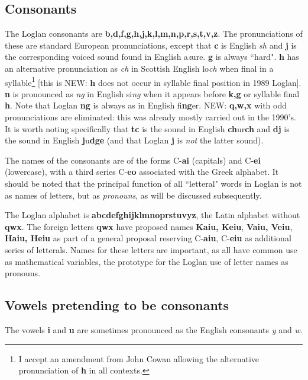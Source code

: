 \documentclass[12pt]{book}
\begin{document}
\subsection{Consonants}

The Loglan consonants are {\bf b,d,f,g,h,j,k,l,m,n,p,r,s,t,v,z}.  The pronunciations of these are standard European pronunciations, except that {\bf c} is English {\em sh} and {\bf j} is the corresponding voiced sound found in English a{\em z}ure.  {\bf g} is always ``hard".  {\bf h} has an alternative pronunciation as {\em ch} in Scottish English lo{\em ch} when final in a syllable\footnote{I accept an amendment from John Cowan allowing the alternative pronunciation of {\bf h} in all contexts.} [this is NEW:  {\bf h} does not occur in syllable final position in 1989 Loglan].  {\bf n} is pronounced as {\em ng} in English si{\em ng} when it appears before {\bf k,g} or syllable final {\bf h}.  Note that Loglan {\bf ng} is always as in English fi{\bf ng}er.  NEW:  {\bf q,w,x} with odd pronunciations are eliminated:  this was already mostly carried out in the 1990's.  It is worth noting specifically that {\bf tc} is the sound in English {\bf ch}ur{\bf ch} and {\bf dj} is the sound in English {\bf j}u{\bf dge} (and that Loglan {\bf j} is {\em not\/} the latter sound).

The names of the consonants are of the forms C-{\bf ai} (capitals) and C-{\bf ei} (lowercase), with a third series C-{\bf eo} associated with the Greek alphabet.   It should be noted that the principal function of all ``letteral" words in Loglan is not as names of letters, but as {\em pronouns\/}, as will be discussed subsequently.  

The Loglan alphabet is {\bf abcdefghijklmnoprstuvyz}, the Latin alphabet without {\bf qwx}.  The foreign letters {\bf qwx}
have proposed names {\bf Kaiu, Keiu}, {\bf Vaiu, Veiu}, {\bf Haiu, Heiu} as part of a general proposal reserving C-{\bf aiu}, C-{\bf eiu} as additional series of letterals.    Names for these letters are important, as all have common use as mathematical variables, the prototype for the Loglan use of letter names as pronouns.


\subsection{Vowels pretending to be consonants}

The vowels {\bf i} and {\bf u} are sometimes pronounced as the English consonants {\em y} and {\em w}.
\end{document}
